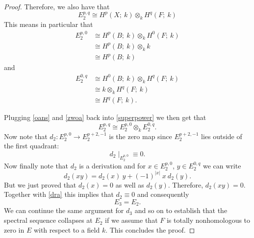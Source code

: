 \begin{proof}
Therefore, we also have that
    \begin{equation}\label{superpower}
        E_2^{p,q}\cong H^p(X;\ k)\otimes_k H^q(F;\ k)
    \end{equation}
    This means in particular that
    \begin{equation}\label{oans}
        \begin{aligned}
        E^{p,0}_2 &\cong H^p{(B;\ k)} \otimes_k H^0(F;\ k)\\
        & \cong H^p{(B;\ k)} \otimes_k k\\
        & \cong H^p{(B;\ k)}
    \end{aligned}
    \end{equation} 
    and
    \begin{equation}\label{zwoa}
        \begin{aligned}
        E^{0,q}_2 &\cong H^0(B;\ k) \otimes_k H^q(F;\ k)\\
        & \cong k \otimes_k H^q(F; \ k)\\
        & \cong  H^q(F; \ k).
    \end{aligned}
    \end{equation}
    
    Plugging \ref{oans} and \eqref{zwoa} back into \eqref{superpower} we then get that 
    \begin{equation}\label{dra}
        E_2^{p,q}\cong  E^{p,0}_2 \otimes_k  E^{0, q}_2 .
    \end{equation}
    Now note that $d_2: E_2^{p,0}\to E^{p+2,-1}_2$ is the zero map since $E^{p+2,-1}_2$ lies outside of the first quadrant:
    \begin{equation*}
        d_2\mid_{E^{p,0}_2} \equiv 0.
    \end{equation*}
    Now finally note that $d_2$ is a derivation and  for $x\in E^{p,0}_2$, $y\in E^{0,q}_2$ we can write
    \begin{equation*}
        d_2(xy) = d_2(x)\ y + (-1)^{|x|}\ x\ d_2(y).
    \end{equation*}
    But we just proved that $d_2(x)=0$ as well as $d_2(y)$. Therefore, $d_2(xy) = 0$. Together with \eqref{dra} this implies that $d_2 \equiv 0$ and consequently
    \begin{equation*}
        E_3 = E_2.
    \end{equation*}
    We can continue the same argument for $d_3$ and so on to establish that the spectral sequence collapses at $E_2$ if we assume that $F$ is totally nonhomologous to zero in $E$ with respect to a field $k$. This concludes the proof.
    
    
\end{proof}

